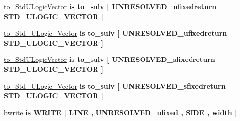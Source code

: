 \begin{DoxyCompactItemize}
\item 
\hyperlink{classfixed__pkg_aa7efe4e1451683feeb97cd0fbca55b5a}{to\+\_\+\+Std\+U\+Logic\+Vector}  {\bfseries {\bfseries \textcolor{keywordflow}{is}\textcolor{vhdlchar}{ }\textcolor{vhdlchar}{to\+\_\+sulv}\textcolor{vhdlchar}{ }\textcolor{vhdlchar}{\mbox{[}}\textcolor{vhdlchar}{ }\textcolor{vhdlchar}{U\+N\+R\+E\+S\+O\+L\+V\+E\+D\+\_\+ufixedreturn}\textcolor{vhdlchar}{ }\textcolor{comment}{S\+T\+D\+\_\+\+U\+L\+O\+G\+I\+C\+\_\+\+V\+E\+C\+T\+O\+R}\textcolor{vhdlchar}{ }\textcolor{vhdlchar}{\mbox{]}}\textcolor{vhdlchar}{ }}} {\bfseries \textcolor{vhdlchar}{ }} 
\item 
\hyperlink{classfixed__pkg_a4e3f344d59c24177d77e21b5b4b34d9c}{to\+\_\+\+Std\+\_\+\+U\+Logic\+\_\+\+Vector}  {\bfseries {\bfseries \textcolor{keywordflow}{is}\textcolor{vhdlchar}{ }\textcolor{vhdlchar}{to\+\_\+sulv}\textcolor{vhdlchar}{ }\textcolor{vhdlchar}{\mbox{[}}\textcolor{vhdlchar}{ }\textcolor{vhdlchar}{U\+N\+R\+E\+S\+O\+L\+V\+E\+D\+\_\+ufixedreturn}\textcolor{vhdlchar}{ }\textcolor{comment}{S\+T\+D\+\_\+\+U\+L\+O\+G\+I\+C\+\_\+\+V\+E\+C\+T\+O\+R}\textcolor{vhdlchar}{ }\textcolor{vhdlchar}{\mbox{]}}\textcolor{vhdlchar}{ }}} {\bfseries \textcolor{vhdlchar}{ }} 
\item 
\hyperlink{classfixed__pkg_a94275a3a9987d9b7662ce161a6fae998}{to\+\_\+\+Std\+U\+Logic\+Vector}  {\bfseries {\bfseries \textcolor{keywordflow}{is}\textcolor{vhdlchar}{ }\textcolor{vhdlchar}{to\+\_\+sulv}\textcolor{vhdlchar}{ }\textcolor{vhdlchar}{\mbox{[}}\textcolor{vhdlchar}{ }\textcolor{vhdlchar}{U\+N\+R\+E\+S\+O\+L\+V\+E\+D\+\_\+sfixedreturn}\textcolor{vhdlchar}{ }\textcolor{comment}{S\+T\+D\+\_\+\+U\+L\+O\+G\+I\+C\+\_\+\+V\+E\+C\+T\+O\+R}\textcolor{vhdlchar}{ }\textcolor{vhdlchar}{\mbox{]}}\textcolor{vhdlchar}{ }}} {\bfseries \textcolor{vhdlchar}{ }} 
\item 
\hyperlink{classfixed__pkg_a18893ae809aac77985ccdce99f05da6b}{to\+\_\+\+Std\+\_\+\+U\+Logic\+\_\+\+Vector}  {\bfseries {\bfseries \textcolor{keywordflow}{is}\textcolor{vhdlchar}{ }\textcolor{vhdlchar}{to\+\_\+sulv}\textcolor{vhdlchar}{ }\textcolor{vhdlchar}{\mbox{[}}\textcolor{vhdlchar}{ }\textcolor{vhdlchar}{U\+N\+R\+E\+S\+O\+L\+V\+E\+D\+\_\+sfixedreturn}\textcolor{vhdlchar}{ }\textcolor{comment}{S\+T\+D\+\_\+\+U\+L\+O\+G\+I\+C\+\_\+\+V\+E\+C\+T\+O\+R}\textcolor{vhdlchar}{ }\textcolor{vhdlchar}{\mbox{]}}\textcolor{vhdlchar}{ }}} {\bfseries \textcolor{vhdlchar}{ }} 
\item 
\hyperlink{classfixed__pkg_a8a3d70a8fa1aff7e05b3cb973c811353}{bwrite}  {\bfseries {\bfseries \textcolor{keywordflow}{is}\textcolor{vhdlchar}{ }\textcolor{vhdlchar}{W\+R\+I\+T\+E}\textcolor{vhdlchar}{ }\textcolor{vhdlchar}{\mbox{[}}\textcolor{vhdlchar}{ }\textcolor{vhdlchar}{L\+I\+N\+E}\textcolor{vhdlchar}{ }\textcolor{vhdlchar}{,}\textcolor{vhdlchar}{ }{\bfseries \hyperlink{classfixed__pkg_ae78bc2b36d22f6abeac163955e8a587d}{U\+N\+R\+E\+S\+O\+L\+V\+E\+D\+\_\+ufixed}} \textcolor{vhdlchar}{ }\textcolor{vhdlchar}{,}\textcolor{vhdlchar}{ }\textcolor{vhdlchar}{S\+I\+D\+E}\textcolor{vhdlchar}{ }\textcolor{vhdlchar}{,}\textcolor{vhdlchar}{ }\textcolor{vhdlchar}{width}\textcolor{vhdlchar}{ }\textcolor{vhdlchar}{\mbox{]}}\textcolor{vhdlchar}{ }}} {\bfseries \textcolor{vhdlchar}{ }} 

\end{DoxyCompactItemize}
